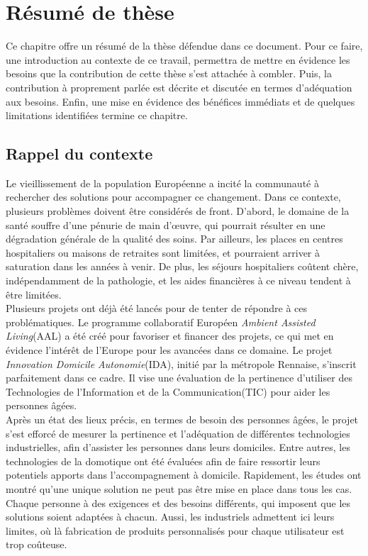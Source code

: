 
\chapter{Résumé de thèse}

Ce chapitre offre un résumé de la thèse défendue dans ce document. Pour ce faire, une introduction au contexte de ce travail, permettra de mettre en évidence les besoins que la contribution de cette thèse s'est attachée à combler. Puis, la contribution à proprement parlée est décrite et discutée en termes d'adéquation aux besoins. Enfin, une mise en évidence des bénéfices immédiats et de quelques limitations identifiées termine ce chapitre.

\section{Rappel du contexte}

Le vieillissement de la population Européenne a incité la communauté à rechercher des solutions pour accompagner ce changement. Dans ce contexte, plusieurs problèmes doivent être considérés de front. D'abord, le domaine de la santé souffre d'une pénurie de main d'\oe uvre, qui pourrait résulter en une dégradation générale de la qualité des soins. Par ailleurs, les places en centres hospitaliers ou maisons de retraites sont limitées, et pourraient arriver à saturation dans les années à venir. De plus, les séjours hospitaliers coûtent chère, indépendamment de la pathologie, et les aides financières à ce niveau tendent à être limitées.\\
Plusieurs projets ont déjà été lancés pour de tenter de répondre à ces problématiques. Le programme collaboratif Européen {\it Ambient Assisted Living}(AAL) a été créé pour favoriser et financer des projets, ce qui met en évidence l'intérêt de l'Europe pour les avancées dans ce domaine. Le projet {\it Innovation Domicile Autonomie}(IDA), initié par la métropole Rennaise, s'inscrit parfaitement dans ce cadre. Il vise une évaluation de la pertinence d'utiliser des Technologies de l'Information et de la Communication(TIC) pour aider les personnes âgées.\\
Après un état des lieux précis, en termes de besoin des personnes âgées, le projet s'est efforcé de mesurer la pertinence et l'adéquation de différentes technologies industrielles, afin d'assister les personnes dans leurs domiciles. Entre autres, les technologies de la domotique ont été évaluées afin de faire ressortir leurs potentiels apports dans l'accompagnement à domicile. Rapidement, les études ont montré qu'une unique solution ne peut pas être mise en place dans tous les cas. Chaque personne à des exigences et des besoins différents, qui imposent que les solutions soient adaptées à chacun. Aussi, les industriels admettent ici leurs limites, où là fabrication de produits personnalisés pour chaque utilisateur est trop coûteuse.\\

